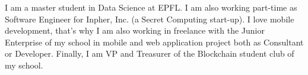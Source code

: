 

\begin{cvparagraph}

I am a master student in Data Science at EPFL. I am also working part-time as Software Engineer for Inpher, Inc. (a Secret Computing start-up). I love mobile development, that's why I am also working in freelance with the Junior Enterprise of my school in mobile and web application project both as Consultant or Developer. Finally, I am VP and Treasurer of the Blockchain student club of my school.  
\end{cvparagraph}
